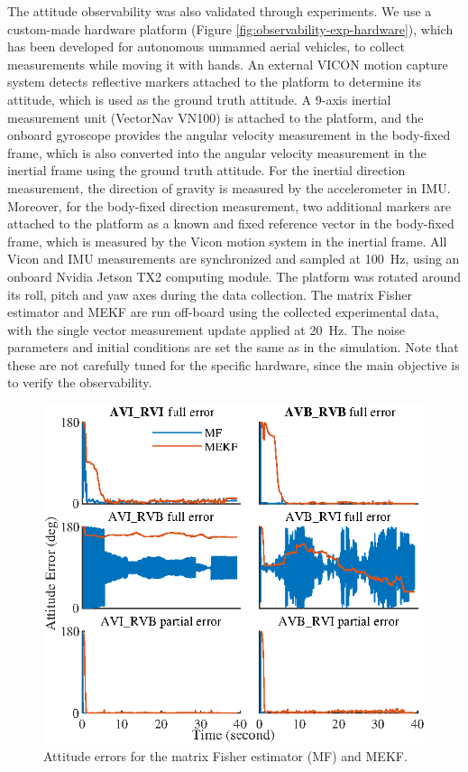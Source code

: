 The attitude observability was also validated through experiments.
We use a custom-made hardware platform (Figure \ref{fig:observability-exp-hardware}), which has been developed for autonomous unmanned aerial vehicles, to collect measurements while moving it with hands.
An external VICON motion capture system detects reflective markers attached to the platform to determine its attitude, which is used as the ground truth attitude.
A 9-axis inertial measurement unit (VectorNav VN100) is attached to the platform, and the onboard gyroscope provides the angular velocity measurement in the body-fixed frame, which is also converted into the angular velocity measurement in the inertial frame using the ground truth attitude. 
For the inertial direction measurement, the direction of gravity is measured by the accelerometer in IMU.
Moreover, for the body-fixed direction measurement, two additional markers are attached to the platform as a known and fixed reference vector in the body-fixed frame, which is measured by the Vicon motion system in the inertial frame.
All Vicon and IMU measurements are synchronized and sampled at \SI{100}{\hertz}, using an onboard Nvidia Jetson TX2 computing module.
The platform was rotated around its roll, pitch and yaw axes during the data collection.
The matrix Fisher estimator and MEKF are run off-board using the collected experimental data, with the single vector measurement update applied at \SI{20}{\hertz}.
The noise parameters and initial conditions are set the same as in the simulation.
Note that these are not carefully tuned for the specific hardware, since the main objective is to verify the observability.

\begin{figure}
	\centering
	\includegraphics[scale=1.4]{figures/observability/attitudeError-Exp}
	\caption{Attitude errors for the matrix Fisher estimator (MF) and MEKF. \label{fig:observability-attitudeError-Exp}}
\end{figure}

